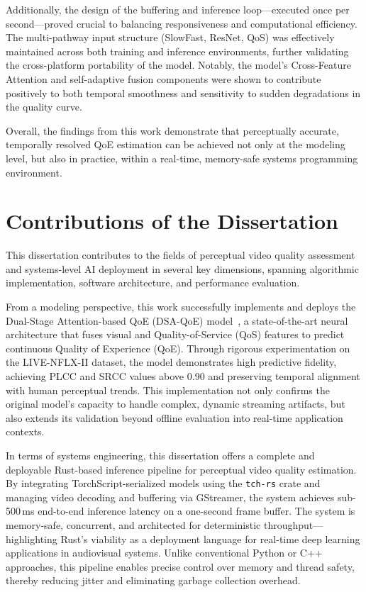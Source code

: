 Additionally, the design of the buffering and inference loop—executed once per second—proved crucial to balancing responsiveness and computational efficiency. The multi-pathway input structure (SlowFast, ResNet, QoS) was effectively maintained across both training and inference environments, further validating the cross-platform portability of the model. Notably, the model's Cross-Feature Attention and self-adaptive fusion components were shown to contribute positively to both temporal smoothness and sensitivity to sudden degradations in the quality curve.

Overall, the findings from this work demonstrate that perceptually accurate, temporally resolved QoE estimation can be achieved not only at the modeling level, but also in practice, within a real-time, memory-safe systems programming environment.

\section{Contributions of the Dissertation}

This dissertation contributes to the fields of perceptual video quality assessment and systems-level AI deployment in several key dimensions, spanning algorithmic implementation, software architecture, and performance evaluation.

From a modeling perspective, this work successfully implements and deploys the Dual-Stage Attention-based QoE (DSA-QoE) model~\cite{jia2024continuous}, a state-of-the-art neural architecture that fuses visual and Quality-of-Service (QoS) features to predict continuous Quality of Experience (QoE). Through rigorous experimentation on the LIVE-NFLX-II dataset, the model demonstrates high predictive fidelity, achieving PLCC and SRCC values above 0.90 and preserving temporal alignment with human perceptual trends. This implementation not only confirms the original model's capacity to handle complex, dynamic streaming artifacts, but also extends its validation beyond offline evaluation into real-time application contexts.

In terms of systems engineering, this dissertation offers a complete and deployable Rust-based inference pipeline for perceptual video quality estimation. By integrating TorchScript-serialized models using the \texttt{tch-rs} crate and managing video decoding and buffering via GStreamer, the system achieves sub-500\,ms end-to-end inference latency on a one-second frame buffer. The system is memory-safe, concurrent, and architected for deterministic throughput—highlighting Rust’s viability as a deployment language for real-time deep learning applications in audiovisual systems. Unlike conventional Python or C++ approaches, this pipeline enables precise control over memory and thread safety, thereby reducing jitter and eliminating garbage collection overhead.

